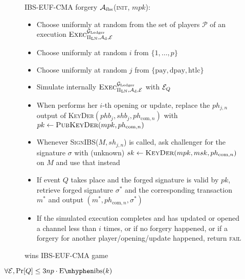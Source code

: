   \begin{figure}[H]
    \begin{algobox}{\textsf{IBS-EUF-CMA} forgery}
      $\mathcal{A}_{\mathrm{ibs}}$(\textsc{init}, $mpk$):
      \begin{itemize}
        \item Choose uniformly at random \alice{} from the set of players
        $\mathcal{P}$ of an execution
        $\textsc{Exec}^{\mathcal{G}_{\mathrm{Ledger}}}_{\Pi_{\mathrm{LN}}, \mathcal{A}_{\mathrm{d}},
        \mathcal{E}}$
        \item Choose uniformly at random $i$ from $\{1, \dots, p\}$
        \item Choose uniformly at random $j$ from $\{\mathrm{pay},
        \mathrm{dpay}, \mathrm{htlc}\}$
        \item Simulate internally
        $\textsc{Exec}^{\mathcal{G}_{\mathrm{Ledger}}}_{\Pi_{\mathrm{LN}}, \mathcal{A}_{\mathrm{d}},
        \mathcal{E}}$ with $\mathcal{E}_Q$
        \item When \alice{} performs her $i$-th opening or update, replace the
        $ph_{j, n}$ output of \textsc{KeyDer}$(phb_j, shb_j, ph_{\mathrm{com},
        n})$ with $pk \gets \textsc{PubKeyDer}(mpk, ph_{\mathrm{com}, n})$
        \item Whenever \textsc{SignIBS}($M, sh_{j, n}$) is called, ask
        challenger for the signature $\sigma$ with (unknown) $sk \gets
        \textsc{KeyDer}(mpk, msk, ph_{\mathrm{com}, n})$ on $M$ and use that
        instead
        \item If event $Q$ takes place and the forged signature is valid by
        $pk$, retrieve forged signature $\sigma^*$ and the corresponding
        transaction $m^*$ and output $(m^*, ph_{\mathrm{com}, n},\sigma^*)$
        \item If the simulated execution completes and \alice{} has updated or
        opened a channel less than $i$ times, or if no forgery happened, or if a
        forgery for another player/opening/update happened, return \textsc{fail}
      \end{itemize}
    \end{algobox}
    \caption{wins \textsf{IBS-EUF-CMA} game}
    \label{alg:forge:ibs}
  \end{figure}

  \begin{proposition}
  \label{prop:forgery:ibs}
    $\forall \environment, \Pr[Q] \leq 3np \cdot \mathrm{E \mhyphen ibs}(k)$
  \end{proposition}

